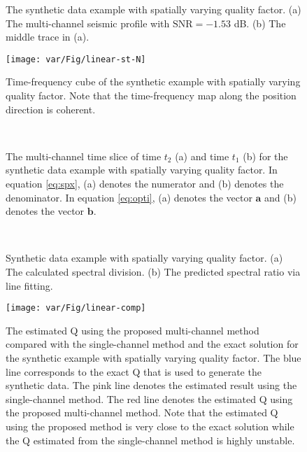 \begin{figure}[htb!]
	\centering
	\caption{The synthetic data example  with spatially varying quality factor. (a) The multi-channel seismic profile with $\text{SNR}=-1.53$ dB. (b) The middle trace in (a).}
	\label{fig:linear-0,linear-15}
\end{figure}

\begin{figure}[htb!]
	\centering
	\texttt{[image: var/Fig/linear-st-N]}
	\caption{Time-frequency cube of the synthetic example  with spatially varying quality factor. Note that the time-frequency map along the position direction is coherent. }
	\label{fig:linear-st-N}
\end{figure}


\begin{figure}[htb!]
	\centering
	\\
	\caption{The multi-channel time slice of time $t_2$ (a) and time $t_1$ (b) for the synthetic data example  with spatially varying quality factor. In equation \ref{eq:spx}, (a) denotes the numerator and (b) denotes the denominator. In equation \ref{eq:opti}, (a) denotes the vector $\mathbf{a}$ and (b) denotes the vector $\mathbf{b}$.}
	\label{fig:linear-f-t2-N,linear-f-t1-N}
\end{figure}


\begin{figure}[htb!]
	\centering
	\\
	\caption{Synthetic data example with spatially varying quality factor. (a) The calculated spectral division. (b) The predicted spectral ratio via line fitting.}
	\label{fig:linear-ratio-N,linear-lsfits}
\end{figure}


\begin{figure}[htb!]
	\centering
	\texttt{[image: var/Fig/linear-comp]}
	\caption{The estimated Q using the proposed multi-channel method compared with the single-channel method and the exact solution for the synthetic example with spatially varying quality factor. The blue line corresponds to the exact Q that is used to generate the synthetic data. The pink line denotes the estimated result using the single-channel method.  The red line denotes the estimated Q using the proposed multi-channel method. Note that the estimated Q using the proposed method is very close to the exact solution while the Q estimated from the single-channel method is highly unstable. }
	\label{fig:linear-comp}
\end{figure}

